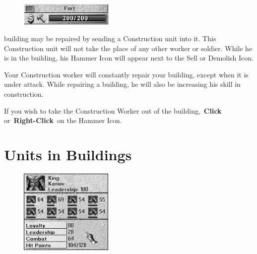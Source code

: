 	
\begin{figure}
	\vspace{-20pt}
	\begin{center}
		\includegraphics[width=0.4\textwidth]{Irepair_building}
	\end{center}
	\vspace{-10pt} %
\end{figure}

 building may be repaired by sending a Construction unit into it. This Construction unit will not take the place of any other worker or soldier. While he is in the building, his Hammer Icon will appear next to the Sell or Demolish Icon.

Your Construction worker will constantly repair your building, except when it is under attack. While repairing a building, he will also be increasing his skill in construction.

If you wish to take the Construction Worker out of the building, \textbf{Click} or \textbf{Right-Click} on the Hammer Icon.

\section{Units in Buildings}


\begin{figure}
	\vspace{-20pt}
	\begin{center}
		\includegraphics[width=0.4\textwidth]{Ifullfort}
	\end{center}
	\vspace{-10pt}
\end{figure}


